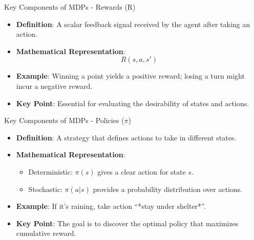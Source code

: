 \documentclass[aspectratio=169]{beamer}
\begin{document}
\begin{frame}[fragile]{Key Components of MDPs - Rewards (R)}
    \begin{itemize}
        \item \textbf{Definition}: A scalar feedback signal received by the agent after taking an action.
        \item \textbf{Mathematical Representation}:
            \begin{equation}
                R(s, a, s')
            \end{equation}
        \item \textbf{Example}: Winning a point yields a positive reward; losing a turn might incur a negative reward.
        \item \textbf{Key Point}: Essential for evaluating the desirability of states and actions.
    \end{itemize}
\end{frame}

\begin{frame}[fragile]{Key Components of MDPs - Policies (\(\pi\))}
    \begin{itemize}
        \item \textbf{Definition}: A strategy that defines actions to take in different states.
        \item \textbf{Mathematical Representation}: 
            \begin{itemize}
                \item Deterministic: \(\pi(s)\) gives a clear action for state \( s \).
                \item Stochastic: \(\pi(a | s)\) provides a probability distribution over actions.
            \end{itemize}
        \item \textbf{Example}: If it’s raining, take action “*stay under shelter*”.
        \item \textbf{Key Point}: The goal is to discover the optimal policy that maximizes cumulative reward.
    \end{itemize}
\end{frame}
\end{document}
